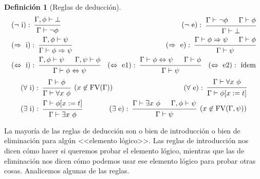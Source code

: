 \documentclass[a4paper, 12pt]{report}
\newcommand{\Ra}{\Rightarrow}
\newcommand{\te}{\text}
\newcommand{\Lra}{\Leftrightarrow}
\theoremstyle{definition}
\newtheorem{definicion}[teorema]{Definición}
\begin{document}
\begin{definicion}[Reglas de deducción]
\begin{align*}
	&(\lnot\te{ i}):~\begin{prooftree}
		\hypo{\Gamma,\phi\vdash\bot}\infer1{\Gamma\vdash\lnot\phi}
	\end{prooftree}&(\lnot\te{ e}):~\begin{prooftree}
		\hypo{\Gamma\vdash\lnot\phi}\hypo{\Gamma\vdash\phi}\infer2{\Gamma\vdash\bot}
	\end{prooftree}\\
	&(\Ra\te{ i}):~\begin{prooftree}
		\hypo{\Gamma,\phi\vdash\psi}\infer1{\Gamma\vdash\phi\Ra\psi}
	\end{prooftree}&(\Ra\te{ e}):~\begin{prooftree}
		\hypo{\Gamma\vdash\phi\Ra\psi}\hypo{\Gamma\vdash\phi}\infer2{\Gamma\vdash\psi}
	\end{prooftree}\\
	&(\Lra\te{ i}):~\begin{prooftree}
		\hypo{\Gamma,\phi\vdash\psi}\hypo{\Gamma,\psi\vdash\phi}
		\infer2{\Gamma\vdash\phi\Lra\psi}
	\end{prooftree} &(\Lra\te{ e1}):~\begin{prooftree}
		\hypo{\Gamma\vdash\phi\Lra\psi}\hypo{\Gamma\vdash\phi}
		\infer2{\Gamma\vdash\psi}
	\end{prooftree}\quad (\Lra\te{ e2}):~\te{ídem}\\
\end{align*}
\begin{align*}
	&(\forall\te{ i}):~\begin{prooftree}
		\hypo{\Gamma\vdash\phi}\infer1[($x\not\in\te{FV}(\Gamma)$)]{\Gamma\vdash\forall x~\phi}
	\end{prooftree}&(\forall\te{ e}):~\begin{prooftree}
		\hypo{\Gamma\vdash\forall x~\phi}\infer1{\Gamma\vdash\phi[x:=t]}\end{prooftree}\\
	&(\exists\te{ i}):~\begin{prooftree}
		\hypo{\Gamma\vdash\phi[x:=t]}\infer1{\Gamma\vdash\exists x~\phi}
	\end{prooftree}& \hspace{-1.5em}(\exists\te{ e}):~\begin{prooftree}
		\hypo{\Gamma\vdash\exists x~\phi}\hypo{\Gamma,\phi\vdash\psi}\infer2[($x\not\in\te{FV}(\Gamma,\psi)$)]{\Gamma\vdash\psi}
	\end{prooftree}
\end{align*}
\end{definicion}
La mayoría de las reglas de deducción son o bien de introducción o bien de eliminación para algún <<elemento lógico>>. Las reglas de introducción nos dicen cómo hacer si queremos probar el elemento lógico, mientras que las de eliminación nos dicen cómo podemos usar ese elemento lógico para probar otras cosas. Analicemos algunas de las reglas.
\end{document}
